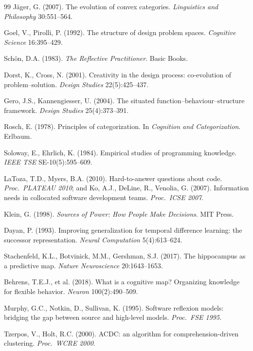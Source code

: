 \documentclass[11pt,oneside]{article}
\theoremstyle{definition}
\begin{document}
\begin{thebibliography}{99}
 Jäger, G. (2007). The evolution of convex categories. \emph{Linguistics and
Philosophy} 30:551--564.

 Goel, V., Pirolli, P. (1992). The structure of design problem spaces.
\emph{Cognitive Science} 16:395--429.

 Schön, D.A. (1983). \emph{The Reflective Practitioner}. Basic Books.

 Dorst, K., Cross, N. (2001). Creativity in the design process:
co-evolution of problem--solution. \emph{Design Studies} 22(5):425--437.

 Gero, J.S., Kannengiesser, U. (2004). The situated
function--behaviour--structure framework. \emph{Design Studies} 25(4):373--391.

 Rosch, E. (1978). Principles of categorization. In \emph{Cognition and
Categorization}. Erlbaum.

 Soloway, E., Ehrlich, K. (1984). Empirical studies of programming
knowledge. \emph{IEEE TSE} SE-10(5):595--609.

 LaToza, T.D., Myers, B.A. (2010). Hard-to-answer questions about code.
\emph{Proc.\ PLATEAU 2010}; and Ko, A.J., DeLine, R., Venolia, G. (2007). Information needs in
collocated software development teams. \emph{Proc.\ ICSE 2007}.

 Klein, G. (1998). \emph{Sources of Power: How People Make Decisions}. MIT
Press.

 Dayan, P. (1993). Improving generalization for temporal difference learning:
the successor representation. \emph{Neural Computation} 5(4):613--624.

 Stachenfeld, K.L., Botvinick, M.M., Gershman, S.J. (2017). The
hippocampus as a predictive map. \emph{Nature Neuroscience} 20:1643--1653.

 Behrens, T.E.J., et al. (2018). What is a cognitive map? Organizing
knowledge for flexible behavior. \emph{Neuron} 100(2):490--509.

 Murphy, G.C., Notkin, D., Sullivan, K. (1995). Software reflexion models:
bridging the gap between source and high-level models. \emph{Proc.\ FSE 1995}.

 Tzerpos, V., Holt, R.C. (2000). ACDC: an algorithm for
comprehension-driven clustering. \emph{Proc.\ WCRE 2000}.


\end{thebibliography}
\end{document}
